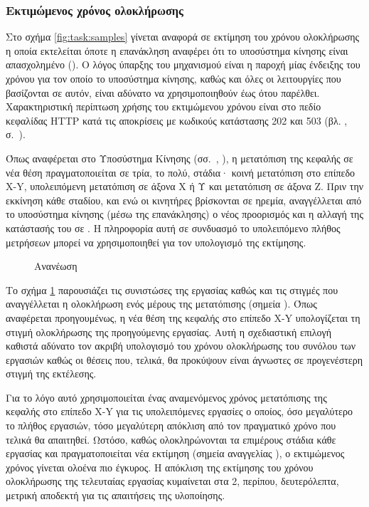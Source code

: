 \subsubsection{Εκτιμώμενος χρόνος ολοκλήρωσης}

Στο σχήμα \ref{fig:task:samples} γίνεται αναφορά σε εκτίμηση του χρόνου
ολοκλήρωσης η οποία εκτελείται όποτε η επανάκληση αναφέρει ότι το υποσύστημα
κίνησης είναι απασχολημένο (). Ο λόγος ύπαρξης του μηχανισμού είναι η
παροχή μίας ένδειξης του χρόνου για τον οποίο το υποσύστημα κίνησης, καθώς και
όλες οι λειτουργίες που βασίζονται σε αυτόν, είναι αδύνατο να χρησιμοποιηθούν
έως ότου παρέλθει. Χαρακτηριστική περίπτωση χρήσης του εκτιμώμενου χρόνου είναι
στο πεδίο κεφαλίδας HTTP  κατά τις αποκρίσεις με κωδικούς
κατάστασης 202 και 503 (βλ. ,
σ.~\pageref{sec:network:impl-resources}).

Όπως αναφέρεται στο Υποσύστημα Κίνησης
(σσ.~\pageref{ssubsec:motor:routing},%
\pageref{ssubsec:motor:common-translation}),
η μετατόπιση της κεφαλής σε νέα θέση πραγματοποιείται σε τρία, το πολύ, στάδια·
κοινή μετατόπιση στο επίπεδο X-Y, υπολειπόμενη μετατόπιση σε άξονα X ή Υ και
μετατόπιση σε άξονα Z. Πριν την εκκίνηση κάθε σταδίου, και ενώ οι κινητήρες
βρίσκονται σε ηρεμία, αναγγέλλεται από το υποσύστημα κίνησης (μέσω της
επανάκλησης) ο νέος προορισμός και η αλλαγή της κατάστασής του σε . Η
πληροφορία αυτή σε συνδυασμό το υπολειπόμενο πλήθος μετρήσεων μπορεί να
χρησιμοποιηθεί για τον υπολογισμό της εκτίμησης.

\begin{figure}
    \caption{Ανανέωση 
    \label{fig:task:estimate-update}}
    \begin{center}
    \end{center}
\end{figure}

Το σχήμα \ref{fig:task:estimate-update} παρουσιάζει τις συνιστώσες της εργασίας
καθώς και τις στιγμές που αναγγέλλεται η ολοκλήρωση ενός μέρους της μετατόπισης
(σημεία ).
Όπως αναφέρεται προηγουμένως, η νέα θέση της κεφαλής στο επίπεδο X-Y
υπολογίζεται τη στιγμή ολοκλήρωσης της προηγούμενης εργασίας. Αυτή η σχεδιαστική
επιλογή καθιστά αδύνατο τον ακριβή υπολογισμό του χρόνου ολοκλήρωσης του συνόλου
των εργασιών καθώς οι θέσεις που, τελικά, θα προκύψουν είναι άγνωστες σε
προγενέστερη στιγμή της εκτέλεσης.

Για το λόγο αυτό χρησιμοποιείται ένας αναμενόμενος χρόνος μετατόπισης της
κεφαλής στο επίπεδο X-Y για τις υπολειπόμενες εργασίες ο οποίος, όσο μεγαλύτερο
το πλήθος εργασιών, τόσο μεγαλύτερη απόκλιση από τον πραγματικό χρόνο που
τελικά θα απαιτηθεί. Ωστόσο, καθώς ολοκληρώνονται τα επιμέρους στάδια κάθε
εργασίας και πραγματοποιείται νέα εκτίμηση (σημεία αναγγελίας ), ο
εκτιμώμενος χρόνος γίνεται ολοένα πιο έγκυρος. Η απόκλιση της εκτίμησης του
χρόνου ολοκλήρωσης της τελευταίας εργασίας κυμαίνεται στα 2, περίπου,
δευτερόλεπτα, μετρική αποδεκτή για τις απαιτήσεις της υλοποίησης.

